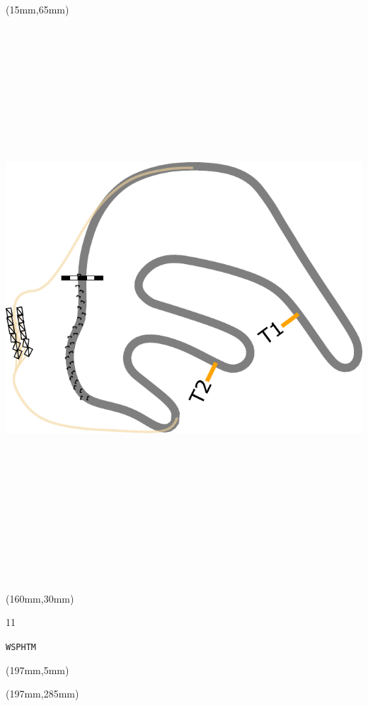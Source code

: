 \begin{textblock*}{185mm}(15mm,65mm)%
\centering
\mbox{\includegraphics[width=185mm,height=210mm,keepaspectratio]{PT/WSPHTM.pdf}}
\end{textblock*}
\begin{textblock*}{40mm}(160mm,30mm)%
\Large
\par{} 
\par11 
\par\hfill\tiny\tt WSPHTM\\
\end{textblock*}
\begin{textblock*}{20mm}(197mm,5mm)%
\fbox{\thepage}
\label{WSPHTM}
\end{textblock*}
\begin{textblock*}{20mm}(197mm,285mm)%
\fbox{\thepage}
\end{textblock*}

